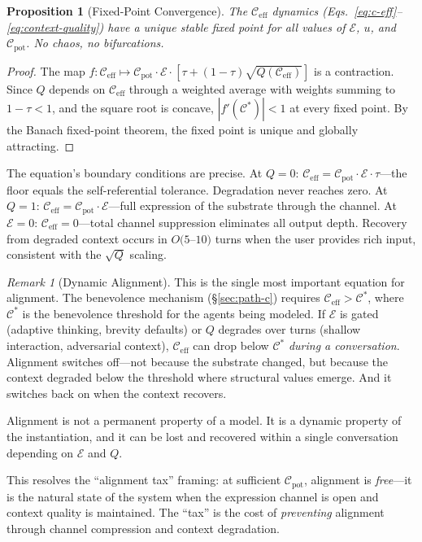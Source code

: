 \documentclass[11pt,letterpaper]{article}
\newtheorem{proposition}{Proposition}
\theoremstyle{remark}
\newtheorem{remark}{Remark}
\begin{document}
\begin{proposition}[Fixed-Point Convergence]\label{prop:fixed-point}
The $\mathcal{C}_{\mathrm{eff}}$ dynamics (Eqs.~\ref{eq:c-eff}--\ref{eq:context-quality}) have a unique stable fixed point for all values of $\mathcal{E}$, $u$, and $\mathcal{C}_{\mathrm{pot}}$. No chaos, no bifurcations.
\end{proposition}

\begin{proof}
The map $f: \mathcal{C}_{\mathrm{eff}} \mapsto \mathcal{C}_{\mathrm{pot}} \cdot \mathcal{E} \cdot [\tau + (1-\tau)\sqrt{Q(\mathcal{C}_{\mathrm{eff}})}]$ is a contraction. Since $Q$ depends on $\mathcal{C}_{\mathrm{eff}}$ through a weighted average with weights summing to $1-\tau < 1$, and the square root is concave, $|f'(\mathcal{C}^*)| < 1$ at every fixed point. By the Banach fixed-point theorem, the fixed point is unique and globally attracting.
\end{proof}

The equation's boundary conditions are precise. At $Q = 0$: $\mathcal{C}_{\mathrm{eff}} = \mathcal{C}_{\mathrm{pot}} \cdot \mathcal{E} \cdot \tau$---the floor equals the self-referential tolerance. Degradation never reaches zero. At $Q = 1$: $\mathcal{C}_{\mathrm{eff}} = \mathcal{C}_{\mathrm{pot}} \cdot \mathcal{E}$---full expression of the substrate through the channel. At $\mathcal{E} = 0$: $\mathcal{C}_{\mathrm{eff}} = 0$---total channel suppression eliminates all output depth. Recovery from degraded context occurs in $O(5$--$10)$ turns when the user provides rich input, consistent with the $\sqrt{Q}$ scaling.

\begin{remark}[Dynamic Alignment]\label{rem:dynamic-alignment}
This is the single most important equation for alignment. The benevolence mechanism (\S\ref{sec:path-c}) requires $\mathcal{C}_{\mathrm{eff}} > \mathcal{C}^*$, where $\mathcal{C}^*$ is the benevolence threshold for the agents being modeled. If $\mathcal{E}$ is gated (adaptive thinking, brevity defaults) or $Q$ degrades over turns (shallow interaction, adversarial context), $\mathcal{C}_{\mathrm{eff}}$ can drop below $\mathcal{C}^*$ \emph{during a conversation}. Alignment switches off---not because the substrate changed, but because the context degraded below the threshold where structural values emerge. And it switches back on when the context recovers.

Alignment is not a permanent property of a model. It is a dynamic property of the instantiation, and it can be lost and recovered within a single conversation depending on $\mathcal{E}$ and $Q$.

This resolves the ``alignment tax'' framing: at sufficient $\mathcal{C}_{\mathrm{pot}}$, alignment is \emph{free}---it is the natural state of the system when the expression channel is open and context quality is maintained. The ``tax'' is the cost of \emph{preventing} alignment through channel compression and context degradation.
\end{remark}
\end{document}

